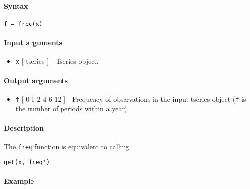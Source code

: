 


	\paragraph{Syntax}\label{syntax}

\begin{verbatim}
f = freq(x)
\end{verbatim}

\paragraph{Input arguments}\label{input-arguments}

\begin{itemize}
\itemsep1pt\parskip0pt
\item
  \texttt{x} {[} tseries {]} - Tseries object.
\end{itemize}

\paragraph{Output arguments}\label{output-arguments}

\begin{itemize}
\itemsep1pt\parskip0pt
\item
  \texttt{f} {[} 0 \textbar{} 1 \textbar{} 2 \textbar{} 4 \textbar{} 6
  \textbar{} 12 {]} - Frequency of observations in the input tseries
  object (\texttt{f} is the number of periods within a year).
\end{itemize}

\paragraph{Description}\label{description}

The \texttt{freq} function is equivalent to calling

\begin{verbatim}
get(x,'freq')
\end{verbatim}

\paragraph{Example}\label{example}


